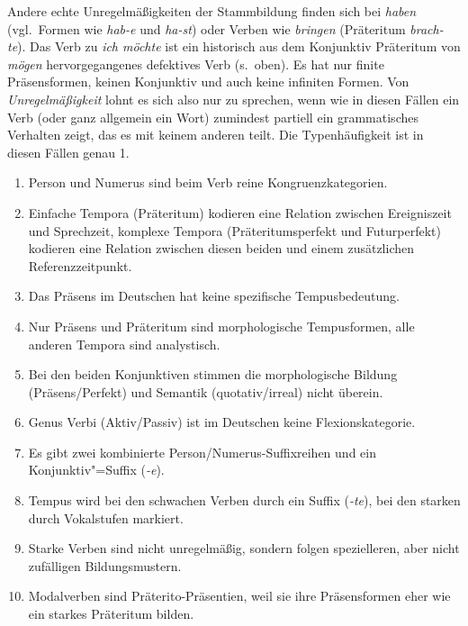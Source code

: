 Andere echte Unregelmäßigkeiten der Stammbildung finden sich bei \textit{haben} (vgl.\ Formen wie \textit{hab-e} und \textit{ha-st}) oder Verben wie \textit{bringen} (Präteritum \textit{brach-te}).
\label{abs:9z32fqgsve}Das Verb zu \textit{ich möchte} ist ein historisch aus dem Konjunktiv Präteritum von \textit{mögen} hervorgegangenes defektives Verb (s.\ oben).
Es hat nur finite Präsensformen, keinen Konjunktiv und auch keine infiniten Formen.
Von \textit{Unregelmäßigkeit} lohnt es sich also nur zu sprechen, wenn wie in diesen Fällen ein Verb (oder ganz allgemein ein Wort) zumindest partiell ein grammatisches Verhalten zeigt, das es mit keinem anderen teilt.
Die Typenhäufigkeit ist in diesen Fällen genau 1.

\Zusammenfassung

\begin{enumerate}\Lf
  \item Person und Numerus sind beim Verb reine Kongruenzkategorien.
  \item Einfache Tempora (Präteritum) kodieren eine Relation zwischen Ereigniszeit und Sprechzeit, komplexe Tempora (Präteritumsperfekt und Futurperfekt) kodieren eine Relation zwischen diesen beiden und einem zusätzlichen Referenzzeitpunkt.
  \item Das Präsens im Deutschen hat keine spezifische Tempusbedeutung.
  \item Nur Präsens und Präteritum sind morphologische Tempusformen, alle anderen Tempora sind analystisch.
  \item Bei den beiden Konjunktiven stimmen die morphologische Bildung (Präsens\slash Perfekt) und Semantik (quotativ\slash irreal) nicht überein.
  \item Genus Verbi (Aktiv\slash Passiv) ist im Deutschen keine Flexionskategorie.
  \item Es gibt zwei kombinierte Person\slash Numerus-Suffixreihen und ein Konjunktiv"=Suffix (\textit{-e}).
  \item Tempus wird bei den schwachen Verben durch ein Suffix (\textit{-te}), bei den starken durch Vokalstufen markiert.
  \item Starke Verben sind nicht unregelmäßig, sondern folgen spezielleren, aber nicht zufälligen Bildungsmustern.
  \item Modalverben sind Präterito-Präsentien, weil sie ihre Präsensformen eher wie ein starkes Präteritum bilden.
\end{enumerate}

\Uebungen

